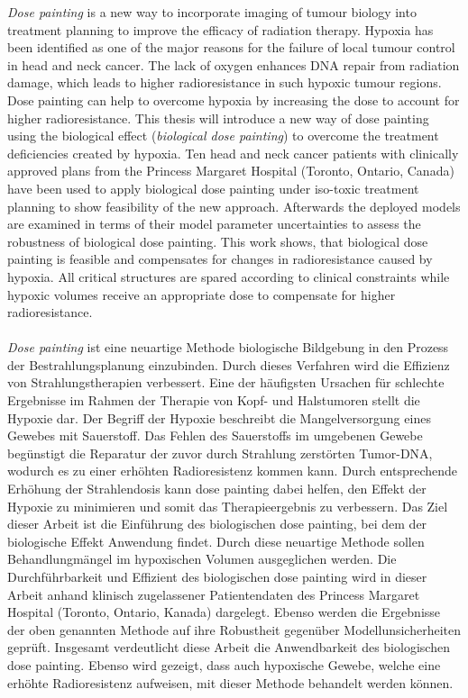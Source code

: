
\textit{Dose painting} is a new way to incorporate imaging of tumour biology into treatment planning to improve the efficacy of radiation therapy.  Hypoxia has been identified as one of the major reasons for the failure of local tumour control in head and neck cancer. The lack of oxygen enhances DNA repair from radiation damage, which leads to higher radioresistance in such hypoxic tumour regions. Dose painting can help to overcome hypoxia by increasing the dose to account for higher radioresistance. This thesis will introduce a new way of dose painting using the biological effect (\textit{biological dose painting}) to overcome the treatment deficiencies created by hypoxia. Ten head and neck cancer patients with clinically approved plans from the Princess Margaret Hospital (Toronto, Ontario, Canada) have been used to apply biological dose painting under iso-toxic treatment planning to show feasibility of the new approach. Afterwards the deployed models are examined in terms of their model parameter uncertainties to assess the robustness of biological dose painting. This work shows, that biological dose painting is feasible and compensates for changes in radioresistance caused by hypoxia. All critical structures are spared according to clinical constraints while hypoxic volumes receive an appropriate dose to compensate for higher radioresistance.\\\\\textit{Dose painting} ist eine neuartige Methode biologische Bildgebung in den Prozess der Bestrahlungsplanung einzubinden. Durch dieses Verfahren wird die Effizienz von Strahlungstherapien verbessert. Eine der h\"aufigsten Ursachen f\"ur schlechte Ergebnisse im Rahmen der Therapie von Kopf- und Halstumoren stellt die Hypoxie dar. Der Begriff der Hypoxie beschreibt die Mangelversorgung eines Gewebes mit Sauerstoff. Das Fehlen des Sauerstoffs im umgebenen Gewebe beg\"unstigt die Reparatur der zuvor durch Strahlung zerst\"orten Tumor-DNA, wodurch es zu einer erh\"ohten Radioresistenz kommen kann. Durch entsprechende Erh\"ohung der Strahlendosis kann dose painting dabei helfen, den Effekt der Hypoxie zu minimieren und somit das Therapieergebnis zu verbessern. Das Ziel dieser Arbeit ist die Einf\"uhrung des biologischen dose painting, bei dem der biologische Effekt Anwendung findet. Durch diese neuartige Methode sollen Behandlungm\"angel im hypoxischen Volumen ausgeglichen werden. Die Durchf\"uhrbarkeit und Effizient des biologischen dose painting wird in dieser Arbeit anhand klinisch zugelassener Patientendaten des Princess Margaret Hospital (Toronto, Ontario, Kanada) dargelegt. Ebenso werden die Ergebnisse der oben genannten Methode auf ihre Robustheit gegen\"uber Modellunsicherheiten gepr\"uft. Insgesamt verdeutlicht diese Arbeit die Anwendbarkeit des biologischen dose painting. Ebenso wird gezeigt, dass auch hypoxische Gewebe, welche eine erh\"ohte Radioresistenz aufweisen, mit dieser Methode behandelt werden k\"onnen.